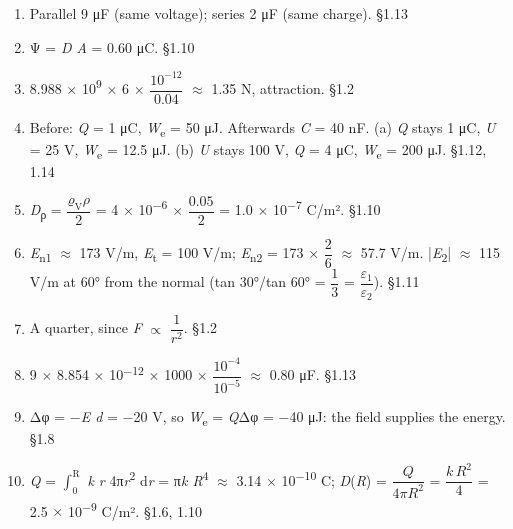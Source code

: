 \documentclass[11pt]{article}
\begin{document}
\begin{keepsection}
\begin{enumerate}
\item Parallel 9 μF (same voltage); series 2 μF (same charge). \hfill{\small\color{FAUblue}§1.13}
\item Ψ = \textit{D A} = 0.60 μC. \hfill{\small\color{FAUblue}§1.10}
\item 8.988 \ensuremath{\times} 10\textsuperscript{9} \ensuremath{\times} 6 \ensuremath{\times} {\small\ensuremath{\dfrac{10^{-12}}{0.04}}} \ensuremath{\approx} 1.35 N, attraction. \hfill{\small\color{FAUblue}§1.2}
\item Before: \textit{Q} = 1 μC, \textit{W}\textsubscript{e} = 50 μJ. Afterwards \textit{C} = 40 nF. (a) \textit{Q} stays 1 μC, \textit{U} = 25 V, \textit{W}\textsubscript{e} = 12.5 μJ. (b) \textit{U} stays 100 V, \textit{Q} = 4 μC, \textit{W}\textsubscript{e} = 200 μJ. \hfill{\small\color{FAUblue}§1.12, 1.14}
\item \textit{D}\textsubscript{ρ} = {\small\ensuremath{\dfrac{ϱ_{\mathrm{V}}ρ}{2}}} = 4 \ensuremath{\times} 10\textsuperscript{\ensuremath{-}6} \ensuremath{\times} {\small\ensuremath{\dfrac{0.05}{2}}} = 1.0 \ensuremath{\times} 10\textsuperscript{\ensuremath{-}7} C/m². \hfill{\small\color{FAUblue}§1.10}
\item \textit{E}\textsubscript{n1} \ensuremath{\approx} 173 V/m, \textit{E}\textsubscript{t} = 100 V/m; \textit{E}\textsubscript{n2} = 173 \ensuremath{\times} {\small\ensuremath{\dfrac{2}{6}}} \ensuremath{\approx} 57.7 V/m. |\textit{E}\textsubscript{2}| \ensuremath{\approx} 115 V/m at 60° from the normal (tan 30°/tan 60° = {\small\ensuremath{\dfrac{1}{3}}} = {\small\ensuremath{\dfrac{ε_{1}}{ε_{2}}}}). \hfill{\small\color{FAUblue}§1.11}
\item A quarter, since \textit{F} \ensuremath{\propto} {\small\ensuremath{\dfrac{1}{{r}^{2}}}}. \hfill{\small\color{FAUblue}§1.2}
\item 9 \ensuremath{\times} 8.854 \ensuremath{\times} 10\textsuperscript{\ensuremath{-}12} \ensuremath{\times} 1000 \ensuremath{\times} {\small\ensuremath{\dfrac{10^{-4}}{10^{-5}}}} \ensuremath{\approx} 0.80 μF. \hfill{\small\color{FAUblue}§1.13}
\item Δφ = \ensuremath{-}\textit{E d} = \ensuremath{-}20 V, so \textit{W}\textsubscript{e} = \textit{Q}Δφ = \ensuremath{-}40 μJ: the field supplies the energy. \hfill{\small\color{FAUblue}§1.8}
\item \textit{Q} = $\int_{0}^{\mathrm{R}} $ \textit{k r} 4π\textit{r}\textsuperscript{2} d\textit{r} = π\textit{k R}\textsuperscript{4} \ensuremath{\approx} 3.14 \ensuremath{\times} 10\textsuperscript{\ensuremath{-}10} C; \textit{D}(\textit{R}) = {\small\ensuremath{\dfrac{{Q}}{4π{R}^{2}}}} = {\small\ensuremath{\dfrac{{k\,R}^{2}}{4}}} = 2.5 \ensuremath{\times} 10\textsuperscript{\ensuremath{-}9} C/m². \hfill{\small\color{FAUblue}§1.6, 1.10}

\end{enumerate}
\end{keepsection}
\end{document}
